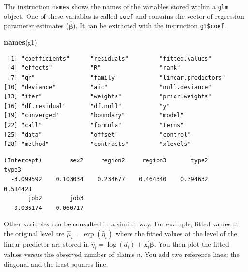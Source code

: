 \documentclass[
]{book}
\newenvironment{Shaded}{\begin{snugshade}}{\end{snugshade}}
\newcommand{\KeywordTok}[1]{\textcolor[rgb]{0.13,0.29,0.53}{\textbf{#1}}}
\newcommand{\NormalTok}[1]{#1}
\newcommand{\OperatorTok}[1]{\textcolor[rgb]{0.81,0.36,0.00}{\textbf{#1}}}
\begin{document}
The instruction \texttt{names} shows the names of the variables stored within a \texttt{glm} object. One of these variables is called \texttt{coef} and contains the vector of regression parameter estimates (\(\hat{\boldsymbol{\beta}}\)). It can be extracted with the instruction \texttt{g1\$coef}.

\begin{Shaded}
\begin{Highlighting}[]
\KeywordTok{names}\NormalTok{(g1)}
\end{Highlighting}
\end{Shaded}

\begin{verbatim}
 [1] "coefficients"      "residuals"         "fitted.values"    
 [4] "effects"           "R"                 "rank"             
 [7] "qr"                "family"            "linear.predictors"
[10] "deviance"          "aic"               "null.deviance"    
[13] "iter"              "weights"           "prior.weights"    
[16] "df.residual"       "df.null"           "y"                
[19] "converged"         "boundary"          "model"            
[22] "call"              "formula"           "terms"            
[25] "data"              "offset"            "control"          
[28] "method"            "contrasts"         "xlevels"          
\end{verbatim}

\begin{Shaded}
\end{Shaded}

\begin{verbatim}
(Intercept)        sex2     region2     region3       type2       type3 
  -3.099592    0.103034    0.234677    0.464340    0.394632    0.584428 
       job2        job3 
  -0.036174    0.060717 
\end{verbatim}

Other variables can be consulted in a similar way. For example, fitted values at the original level are \(\hat{\mu}_i=\exp{(\hat{\eta}_i)}\) where the fitted values at the level of the linear predictor are stored in \(\hat{\eta}_i=\log{(d_i)}+\boldsymbol{x}^{'}_i\hat{\boldsymbol{\beta}}\). You then plot the fitted values versus the observed number of claims \texttt{n}. You add two reference lines: the diagonal and the least squares line.

\begin{Shaded}
\end{Shaded}
\end{document}
